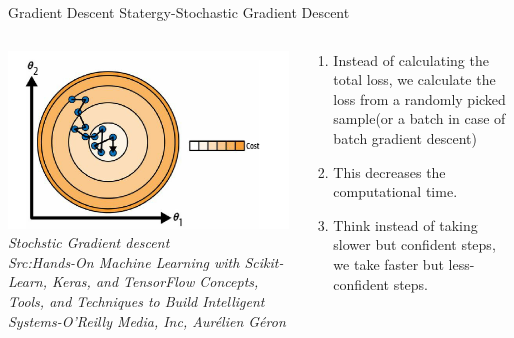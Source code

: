 \begin{frame}{Gradient Descent Statergy-Stochastic Gradient Descent}
	\begin{columns}[T]
	\begin{column}{0.4\textwidth}
	  \includegraphics[width=\textwidth]{images/stochastic gradient descent.png}
	  \tiny{\textit{Stochstic Gradient descent\\ Src:Hands-On Machine Learning with Scikit-Learn, Keras, and TensorFlow  Concepts, Tools, and Techniques to Build Intelligent Systems-O'Reilly Media, Inc, Aurélien Géron}}
	\end{column}
	\begin{column}{0.6\textwidth}
	\begin{enumerate}[$\bullet$]
	\item Instead of calculating the total loss, we calculate the loss from a randomly picked sample(or a batch in case of batch gradient descent)\pause
	\item This decreases the computational time.\pause
	\item Think instead of taking slower but confident steps, we take faster but less-confident steps.
	\end{enumerate}
	\end{column}
  \end{columns}
  \end{frame}

